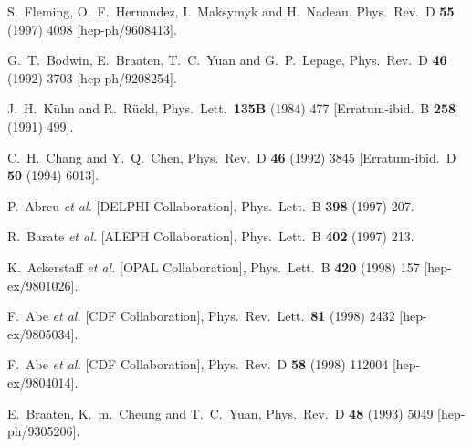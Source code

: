 \begin{thebibliography}{999}
S.~Fleming, O.~F.~Hernandez, I.~Maksymyk and H.~Nadeau,
Phys.\ Rev.\ D {\bf 55} (1997) 4098 
[hep-ph/9608413].

G.~T.~Bodwin, E.~Braaten, T.~C.~Yuan and G.~P.~Lepage,
Phys.\ Rev.\ D {\bf 46} (1992) 3703 
[hep-ph/9208254].

J.~H.~K\"uhn and R.~R\"uckl,
Phys.\ Lett.\  {\bf 135B} (1984) 477
[Erratum-ibid.\ B {\bf 258} (1991) 499].


C.~H.~Chang and Y.~Q.~Chen,
Phys.\ Rev.\ D {\bf 46} (1992) 3845
[Erratum-ibid.\ D {\bf 50} (1994) 6013].

P.~Abreu {\it et al.}  [DELPHI Collaboration],
Phys.\ Lett.\ B {\bf 398} (1997) 207.

R.~Barate {\it et al.}  [ALEPH Collaboration],
Phys.\ Lett.\ B {\bf 402} (1997) 213.

K.~Ackerstaff {\it et al.}  [OPAL Collaboration],
Phys.\ Lett.\ B {\bf 420} (1998) 157
[hep-ex/9801026].

F.~Abe {\it et al.}  [CDF Collaboration],
Phys.\ Rev.\ Lett.\  {\bf 81} (1998) 2432
[hep-ex/9805034].

F.~Abe {\it et al.}  [CDF Collaboration],
Phys.\ Rev.\ D {\bf 58} (1998) 112004
[hep-ex/9804014].

E.~Braaten, K.~m.~Cheung and T.~C.~Yuan,
Phys.\ Rev.\ D {\bf 48} (1993) 5049
[hep-ph/9305206].


\end{thebibliography}
